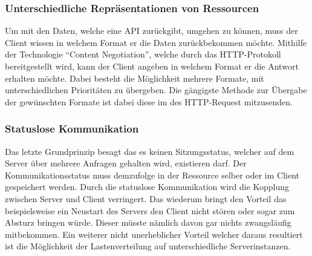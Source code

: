 \subsubsection{Unterschiedliche Repräsentationen von Ressourcen}
Um mit den Daten, welche eine \gls{API} zurückgibt, umgehen zu können, muss der Client wissen in welchem Format er die Daten zurückbekommen möchte. Mithilfe der Technologie \enquote{Content Negotiation}, welche durch das \gls{HTTP}-Protokoll bereitgestellt wird, kann der Client angeben in welchem Format er die Antwort erhalten möchte. Dabei besteht die Möglichkeit mehrere Formate, mit unterschiedlichen Prioritäten zu übergeben. Die gängigste Methode zur Übergabe der gewünschten Formate ist dabei diese im  des \gls{HTTP}-Request mitzusenden.

\subsubsection{Statuslose Kommunikation}
Das letzte Grundprinzip besagt das es keinen Sitzungsstatus, welcher auf dem Server über mehrere Anfragen gehalten wird, existieren darf. Der Kommunikationsstatus muss demzufolge in der Ressource selber oder im Client gespeichert werden. Durch die statuslose Kommunikation wird die Kopplung zwischen Server und Client verringert. Das wiederum bringt den Vorteil das beispielsweise ein Neustart des Servers den Client nicht stören oder sogar zum Absturz bringen würde. Dieser müsste nämlich davon gar nichts zwangsläufig mitbekommen. Ein weiterer nicht unerheblicher Vorteil welcher daraus resultiert ist die Möglichkeit der Lastenverteilung auf unterschiedliche Serverinstanzen.

